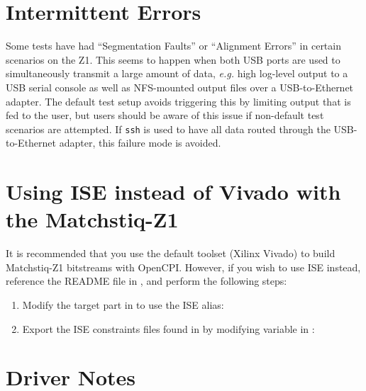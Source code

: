 \begin{appendices}
\section{Intermittent Errors}
Some tests have had ``Segmentation Faults'' or ``Alignment Errors'' in certain scenarios on the Z1. This seems to happen when both USB ports are used to simultaneously transmit a large amount of data, \textit{e.g.} high log-level output to a USB serial console as well as NFS-mounted output files over a USB-to-Ethernet adapter. The default test setup avoids triggering this by limiting output that is fed to the user, but users should be aware of this issue if non-default test scenarios are attempted. If \texttt{ssh} is used to have all data routed through the USB-to-Ethernet adapter, this failure mode is avoided.
\section{Using ISE instead of Vivado with the Matchstiq-Z1}
It is recommended that you use the default toolset (Xilinx Vivado) to build Matchstiq-Z1 bitstreams with OpenCPI. However, if you wish to use ISE instead, reference the README file in , and perform the following steps:
\begin{enumerate}
\item{Modify the target part in  to use the ISE alias:
\subitem {}}
\item{Export the ISE constraints files found in  by modifying  variable in :
\subitem {}}
\end{enumerate}
\section{Driver Notes}

%

\end{appendices}

